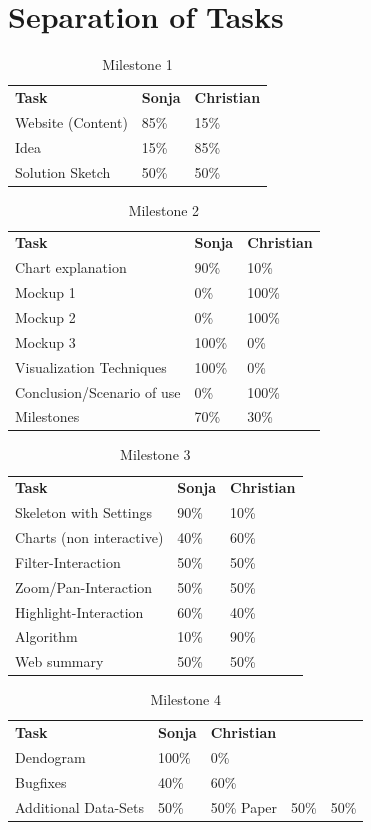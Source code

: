 \documentclass{vgtc}                          %
\begin{document}
\section{Separation of Tasks}
\begin{table}[htb]
\centering
\caption{Milestone 1}
\label{my-label}
\begin{tabular}{@{} p{4cm}p{1cm}p{1cm} @{}}
\textbf{Task} & \textbf{Sonja} & \textbf{Christian} \\
 Website (Content) & 85\% & 15\%\\
 Idea & 15\% & 85\%\\
 Solution Sketch & 50\% & 50\%        
\end{tabular}
\end{table}
\FloatBarrier
\begin{table}[htb]
\centering
\caption{Milestone 2}
\label{my-label}
\begin{tabular}{@{} p{4cm}p{1cm}p{1cm} @{}}
\textbf{Task} & \textbf{Sonja} & \textbf{Christian} \\
 Chart explanation & 90\% & 10\%\\
 Mockup 1 & 0\% & 100\%\\
 Mockup 2 & 0\% & 100\%\\
 Mockup 3 & 100\% & 0\%\\
 Visualization Techniques & 100\% & 0\%\\
 Conclusion/Scenario of use & 0\% & 100\%\\
 Milestones & 70\% & 30\%        
\end{tabular}
\end{table}
\FloatBarrier
\begin{table}[htb]
\centering
\caption{Milestone 3}
\label{my-label}
\begin{tabular}{@{} p{4cm}p{1cm}p{1cm} @{}}
\textbf{Task} & \textbf{Sonja} & \textbf{Christian} \\
 Skeleton with Settings & 90\% & 10\%\\
 Charts (non interactive) & 40\% &  60\%\\
 Filter-Interaction & 50\% & 50\%\\
 Zoom/Pan-Interaction & 50\% & 50\%\\
 Highlight-Interaction & 60\% & 40\%\\
 Algorithm & 10\% & 90\%\\
 Web summary & 50\% & 50\%        
\end{tabular}
\end{table}
\FloatBarrier
\begin{table}[htb]
\centering
\caption{Milestone 4}
\label{my-label}
\begin{tabular}{@{} p{4cm}p{1cm}p{1cm} @{}}
\textbf{Task} & \textbf{Sonja} & \textbf{Christian} \\
 Dendogram & 100\% & 0\%\\
 Bugfixes & 40\% &  60\%\\
 Additional Data-Sets & 50\% & 50\%
 Paper & 50\% & 50\%
\end{tabular}
\end{table}
\FloatBarrier
\end{document}
